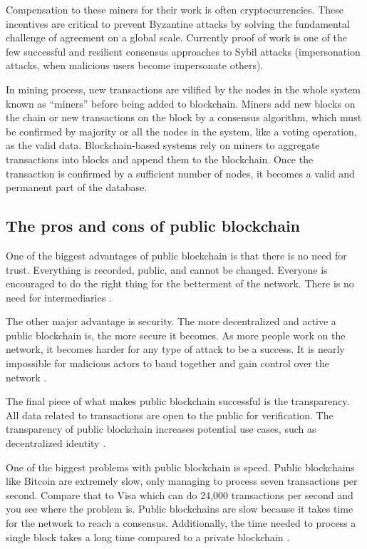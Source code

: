 Compensation to these miners for their work is often cryptocurrencies. These incentives are critical to prevent Byzantine attacks by solving the fundamental challenge of agreement on a global scale. Currently proof of work is one of the few successful and resilient consensus approaches to Sybil attacks \cite{douceur2002sybil} (impersonation attacks, when malicious users become impersonate others).

In mining process, new transactions are vilified by the nodes in the whole system known as “miners” before being added to blockchain. Miners add new blocks on the chain or new transactions on the block by a consensus algorithm, which must be confirmed by majority or all the nodes in the system, like a voting operation, as the valid data. Blockchain-based systems rely on miners to aggregate transactions into blocks and append them to the blockchain. Once the transaction is confirmed by a sufficient number of nodes, it becomes a valid and permanent part of the database. 

\subsection{The pros and cons of public blockchain}\label{sec:prosConsPub}

One of the biggest advantages of public blockchain is that there is no need for trust. Everything is recorded, public, and cannot be changed. Everyone is encouraged to do the right thing for the betterment of the network. There is no need for intermediaries \cite{blockgeeks2018deeper}.

The other major advantage is security. The more decentralized and active a public blockchain is, the more secure it becomes. As more people work on the network, it becomes harder for any type of attack to be a success. It is nearly impossible for malicious actors to band together and gain control over the network \cite{selfkeyOrg}.

The final piece of what makes public blockchain successful is the transparency. All data related to transactions are open to the public for verification. The transparency of public blockchain increases potential use cases, such as decentralized identity \cite{Comstor2018}.

One of the biggest problems with public blockchain is speed. Public blockchains like Bitcoin are extremely slow, only managing to process seven transactions per second. Compare that to Visa which can do 24,000 transactions per second and you see where the problem is. Public blockchains are slow because it takes time for the network to reach a consensus. Additionally, the time needed to process a single block takes a long time compared to a private blockchain \cite{blockgeeks2018deeper}.

